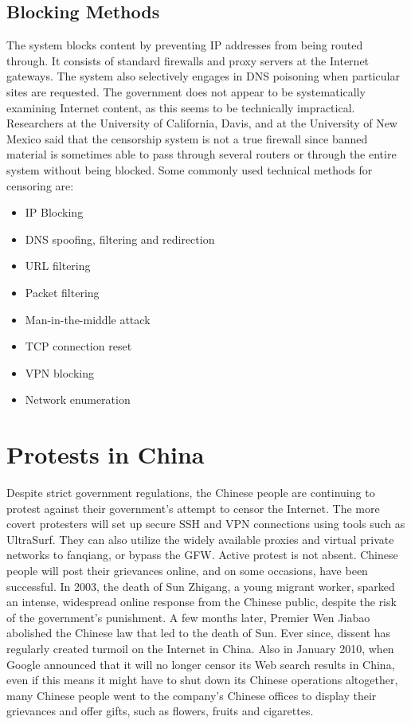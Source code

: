 \documentclass[10pt,conference,a4paper]{IEEEtran}%
\begin{document}
\subsection{Blocking Methods}
The system blocks content by preventing IP addresses from being routed through. It consists of standard firewalls and proxy servers at the Internet gateways. The system also selectively engages in DNS poisoning when particular sites are requested. The government does not appear to be systematically examining Internet content, as this seems to be technically impractical.
Researchers at the University of California, Davis, and at the University of New Mexico said that the censorship system is not a true firewall since banned material is sometimes able to pass through several routers or through the entire system without being blocked.
Some commonly used technical methods for censoring are:

\begin{itemize}
  \item IP Blocking
  \item DNS spoofing, filtering and redirection
  \item URL filtering
  \item Packet filtering
  \item Man-in-the-middle attack
  \item TCP connection reset
  \item VPN blocking
  \item Network enumeration
\end{itemize}

\section{Protests in China}
Despite strict government regulations, the Chinese people are continuing to protest against their government’s attempt to censor the Internet. The more covert protesters will set up secure SSH and VPN connections using tools such as UltraSurf. They can also utilize the widely available proxies and virtual private networks to fanqiang, or bypass the GFW. Active protest is not absent. Chinese people will post their grievances online, and on some occasions, have been successful. In 2003, the death of Sun Zhigang, a young migrant worker, sparked an intense, widespread online response from the Chinese public, despite the risk of the government’s punishment. A few months later, Premier Wen Jiabao abolished the Chinese law that led to the death of Sun. Ever since, dissent has regularly created turmoil on the Internet in China. Also in January 2010, when Google announced that it will no longer censor its Web search results in China, even if this means it might have to shut down its Chinese operations altogether, many Chinese people went to the company’s Chinese offices to display their grievances and offer gifts, such as flowers, fruits and cigarettes.
\end{document}
